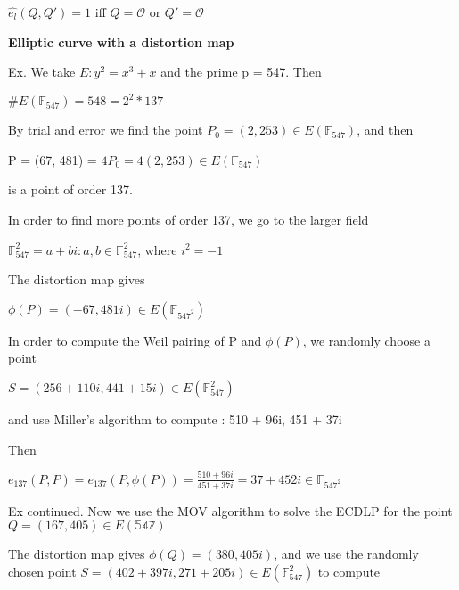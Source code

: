 \documentclass[titlepage]{article}
\begin{document}
\begin{center} 

$\hat{e_l}(Q,Q') = 1$ iff $Q=\mathcal{O}$ or $Q'=\mathcal{O}$

\end{center} 

\textbf{Elliptic curve with a distortion map}

Ex. We take $E: y^2 = x^3 + x$ and the prime p = 547. Then

\begin{center} 
$\#E(\mathbb{F}_{547}) = 548 = 2^2 * 137$
\end{center} 

By trial and error we find the point $P_0 = (2,253) \in E(\mathbb{F}_{547})$, and then 

\begin{center} 
P = (67, 481) = $4P_0 = 4(2,253) \in E(\mathbb{F}_{547})$ 
\end{center} 

is a point of order 137. 

\hspace{\parindent} In order to find more points of order 137, we go to the larger field

\begin{center} 
$\mathbb{F}_{547}^2 = {a + bi : a,b \in \mathbb{F}_{547}^2}$, where $i^2 = -1$
\end{center} 

The distortion map gives 


\begin{center} 
$\phi (P) = (-67,481i) \in E(\mathbb{F}_{{547}^2})$
\end{center} 

In order to compute the Weil pairing of P and $\phi (P)$, we randomly choose a point 

$S = (256 + 110i, 441 + 15i) \in E(\mathbb{F}_{547}^2)$

and use Miller's algorithm to compute : 510 + 96i, 451 + 37i

Then

\begin{center} 
$\hat{e_{137}}(P,P) = e_{137}(P, \phi (P)) = \frac{510+96i}{451+37i} = 37 + 452i \in \mathbb{F}_{{547}^2}$
\end{center} 

Ex continued. Now we use the MOV algorithm to solve the ECDLP for the point $Q = (167,405) \in E(\mathbb{547})$

The distortion map gives $\phi (Q) = (380, 405i)$, and we use the randomly chosen point $S = (402+397i,271+205i) \in E(\mathbb{F}_{547}^2)$ to compute
\end{document}
